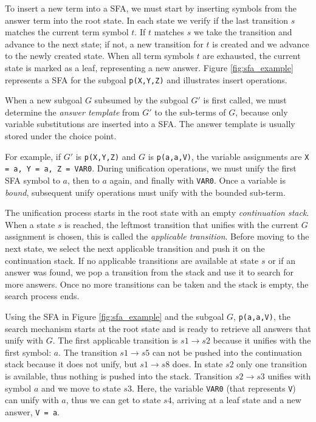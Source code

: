 To insert a new term into a SFA, we must start by inserting symbols from the answer term into the root state.
In each state we verify if the last transition $s$ matches the current term symbol $t$. If $t$ matches $s$
we take the transition and advance to the next state; if not, a new transition for $t$ is created and we advance
to the newly created state. When all term symbols $t$ are exhausted, the current state is marked as a leaf,
representing a new answer.
Figure \ref{fig:sfa_example} represents a SFA for the subgoal \texttt{p(X,Y,Z)} and
illustrates insert operations.

When a new subgoal $G$ subsumed by the subgoal $G'$ is first called, we must determine the \textit{answer template}
from $G'$ to the sub-terms of $G$, because only variable substitutions are inserted into a SFA.
The answer template is usually stored under the choice point.

For example, if $G'$ is \texttt{p(X,Y,Z)} and $G$ is \texttt{p(a,a,V)}, the variable assignments
are \texttt{X = a, Y = a, Z = VAR0}. During unification operations, we must unify the first SFA symbol
to $a$, then to $a$ again, and finally with \texttt{VAR0}.
Once a variable is \textit{bound}, subsequent unify operations must unify with the bounded sub-term.

The unification process starts in the root state with an empty \textit{continuation stack}.
When a state $s$ is reached, the leftmost transition that unifies with the current $G$ assignment is chosen,
this is called the \textit{applicable transition}.
Before moving to the next state, we select the next applicable transition and push it on the continuation stack.
If no applicable transitions are available at state $s$ or if an answer was found, we pop a transition from
the stack and use it to search for more answers. Once no more transitions can be taken and the stack is empty, the
search process ends.

Using the SFA in Figure \ref{fig:sfa_example} and the subgoal $G$, \texttt{p(a,a,V)}, the search mechanism starts
at the root state and is ready to retrieve all answers that unify with $G$.
The first applicable transition is $s1 \rightarrow s2$ because it unifies with the first symbol: $a$. The transition
$s1 \rightarrow s5$ can not be pushed into the continuation stack because it does not unify, but $s1 \rightarrow s8$ does.
In state $s2$ only one transition is available, thus nothing is pushed into the stack.
Transition $s2 \rightarrow s3$ unifies with symbol $a$ and we move to state $s3$. Here, the variable \texttt{VAR0} (that represents \texttt{V})
can unify with $a$, thus we can get to state $s4$, arriving at a leaf state and a new answer, \texttt{V = a}.


